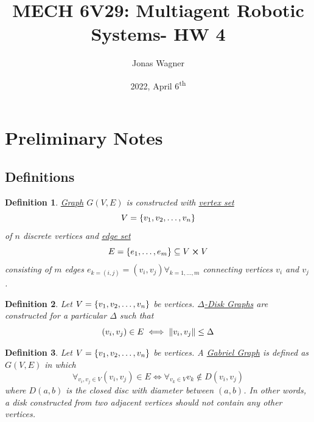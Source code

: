\documentclass[]{article}
\title{MECH 6V29: Multiagent Robotic Systems- HW 4}
\author{Jonas Wagner}
\date{2022, April 6\textsuperscript{th}}
\numberwithin{equation}{section}
\newtheorem{definition}{Definition}
\begin{document}
	

\maketitle

\tableofcontents

\newpage
\section*{Preliminary Notes}

\subsection{Definitions}
\begin{definition} \label{def:graph_def}
	\underline{\emph{Graph}} $G(V,E)$ is constructed with \underline{\emph{vertex set}} \[
		V = \qty{v_1,v_2,\dots,v_n}
	\] of $n$ discrete vertices and \emph{\underline{edge set}} \[
		E = \qty{e_1, \dots, e_m} \subseteq V \cross V
	\] consisting of $m$ edges $e_{k=(i,j)} = (v_i,v_j) \forall_{k=1,\dots,m}$ connecting vertices $v_i$ and $v_j$.
\end{definition}

\begin{definition}\label{def:Delta-disk_graph}
	Let $V = \qty{v_1,v_2,\dots,v_n}$ be vertices.
	\emph{\underline{$\Delta$-Disk Graphs}} are constructed for a particular $\Delta$ such that \[
		(v_i,v_j) \in E \iff \norm{v_i,v_j} \leq \Delta
	\]
\end{definition}

\begin{definition}\label{def:Gabriel_graph}
	Let $V = \qty{v_1,v_2,\dots,v_n}$ be vertices.
	A \emph{\underline{Gabriel Graph}} is defined as $G(V,E)$ in which \[
        \forall_{v_i, v_j \in V} (v_i,v_j) \in E \iff \forall_{v_k \in V} v_k \notin D(v_i,v_j)
    \] where $D(a,b)$ is the closed disc with diameter between $(a,b)$.
    In other words, a disk constructed from two adjacent vertices should not contain any other vertices.
\end{definition}
\end{document}
